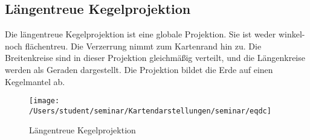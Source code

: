 \subsection{Längentreue Kegelprojektion}
\label{sec:langkeg}
Die längentreue Kegelprojektion ist eine globale Projektion. Sie ist weder winkel- noch flächentreu.
Die Verzerrung nimmt zum Kartenrand hin zu. Die Breitenkreise sind in dieser Projektion gleichmäßig verteilt, und die Längenkreise werden als Geraden dargestellt. Die Projektion bildet die Erde auf einen Kegelmantel ab.\\

\begin{figure}[hbtp]
\centering
\texttt{[image: /Users/student/seminar/Kartendarstellungen/seminar/eqdc]} \caption{Längentreue Kegelprojektion}
\end{figure}
\newpage 